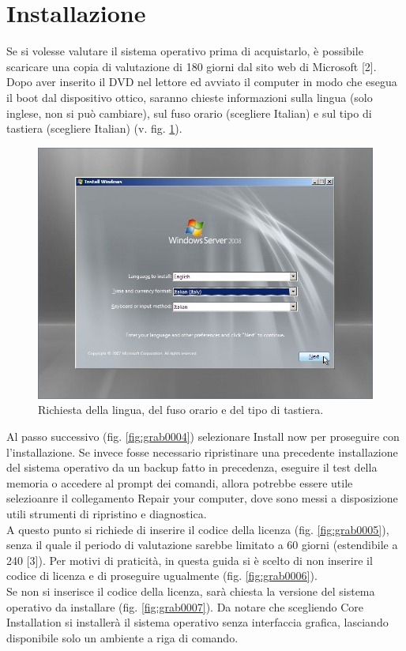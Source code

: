 \section{Installazione}
Se si volesse valutare il sistema operativo prima di acquistarlo, è possibile
scaricare una copia di valutazione di 180 giorni dal sito web di Microsoft [2].
Dopo aver inserito il DVD nel lettore ed avviato il computer in modo che
esegua il boot dal dispositivo ottico, saranno chieste informazioni sulla lingua
(solo inglese, non si può cambiare), sul fuso orario (scegliere Italian) e sul
tipo di tastiera (scegliere Italian) (v. fig. \ref{fig:grab0003}).
\begin{figure}[htbp]
 \centering
 \includegraphics[scale=0.5]{images/grab0003}
 \caption{Richiesta della lingua, del fuso orario e del tipo di tastiera.}
\label{fig:grab0003}
\end{figure}

\indent Al passo successivo (fig. \ref{fig:grab0004}) selezionare Install now per proseguire con
l’installazione. Se invece fosse necessario ripristinare una precedente installazione
del sistema operativo da un backup fatto in precedenza, eseguire il
test della memoria o accedere al prompt dei comandi, allora potrebbe essere
utile selezioanre il collegamento Repair your computer, dove sono messi a
disposizione utili strumenti di ripristino e diagnostica.
\\ \indent A questo punto si richiede di inserire il codice della licenza (fig. \ref{fig:grab0005}), senza
il quale il periodo di valutazione sarebbe limitato a 60 giorni (estendibile a
240 [3]). Per motivi di praticità, in questa guida si è scelto di non inserire il
codice di licenza e di proseguire ugualmente (fig. \ref{fig:grab0006}).
\\ \indent Se non si inserisce il codice della licenza, sarà chiesta la versione del
sistema operativo da installare (fig. \ref{fig:grab0007}). Da notare che scegliendo Core Installation
si installerà il sistema operativo senza interfaccia grafica, lasciando
disponibile solo un ambiente a riga di comando.

